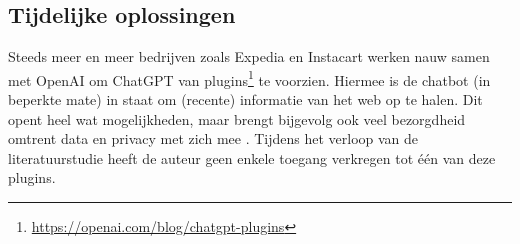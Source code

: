 \subsection{Tijdelijke oplossingen}
Steeds meer en meer bedrijven zoals Expedia en Instacart werken nauw samen met OpenAI om ChatGPT van plugins\footnote{\href{https://openai.com/blog/chatgpt-plugins}{https://openai.com/blog/chatgpt-plugins}} te voorzien. Hiermee is de chatbot (in beperkte mate) in staat om (recente) informatie van het web op te halen. Dit opent heel wat mogelijkheden, maar brengt bijgevolg ook veel bezorgdheid omtrent data en privacy met zich mee \autocite{WillKnight2023}. Tijdens het verloop van de literatuurstudie heeft de auteur geen enkele toegang verkregen tot één van deze plugins.

